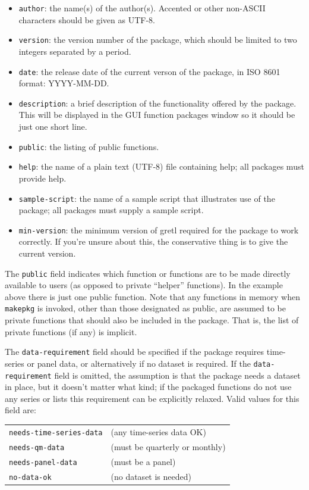 \begin{itemize}
\item \texttt{author}: the name(s) of the author(s). Accented or other
  non-ASCII characters should be given as UTF-8.
\item \texttt{version}: the version number of the package, which should
  be limited to two integers separated by a period.
\item \texttt{date}: the release date of the current verson of the
  package, in ISO 8601 format: YYYY-MM-DD.
\item \texttt{description}: a brief description of the functionality
  offered by the package. This will be displayed in the GUI function
  packages window so it should be just one short line.
\item \texttt{public}: the listing of public functions.
\item \texttt{help}: the name of a plain text (UTF-8) file containing
  help; all packages must provide help.
\item \texttt{sample-script}: the name of a sample script that
 illustrates use of the package; all packages must supply a
 sample script.
\item \texttt{min-version}: the minimum version of gretl required
 for the package to work correctly. If you're unsure about this,
 the conservative thing is to give the current  version.
\end{itemize}

The \texttt{public} field indicates which function or functions are to
be made directly available to users (as opposed to private ``helper''
functions).  In the example above there is just one public
function. Note that any functions in memory when \texttt{makepkg} is
invoked, other than those designated as public, are assumed to be
private functions that should also be included in the package. That
is, the list of private functions (if any) is implicit.

The \texttt{data-requirement} field should be specified if the package
requires time-series or panel data, or alternatively if no dataset is
required.  If the \texttt{data-requirement} field is omitted, the
assumption is that the package needs a dataset in place, but it
doesn't matter what kind; if the packaged functions do not use any
series or lists this requirement can be explicitly relaxed.  Valid
values for this field are:

\begin{center}
\begin{tabular}{ll}
\texttt{needs-time-series-data} & (any time-series data OK) \\ 
\texttt{needs-qm-data} & (must be quarterly or monthly) \\ 
\texttt{needs-panel-data} & (must be a panel) \\
\texttt{no-data-ok} & (no dataset is needed) \\
\end{tabular}
\end{center}

